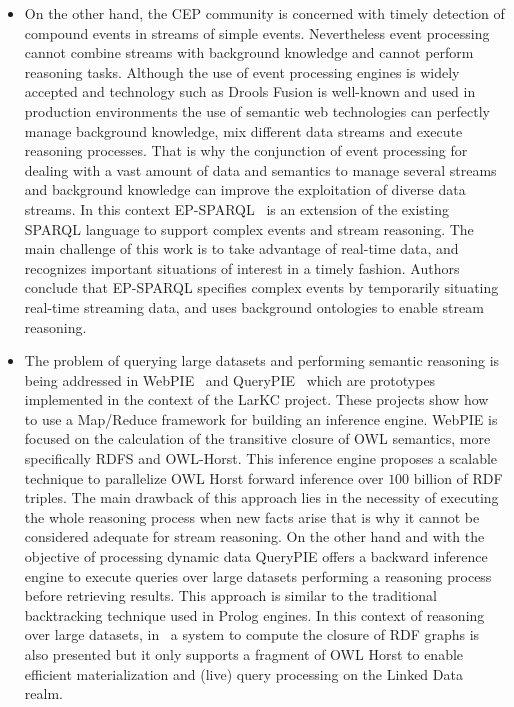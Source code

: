 \begin{itemize}
\item On the other hand, the CEP community is concerned with timely detection of 
compound events in streams of simple events. Nevertheless event processing 
cannot combine streams with background knowledge and cannot perform reasoning 
tasks. Although the use of event processing engines is widely accepted and 
technology such as Drools Fusion is well-known and used in production 
environments the use of semantic web technologies can perfectly manage 
background knowledge, mix different data streams and execute reasoning 
processes. That is why the conjunction of event processing for dealing with a 
vast amount of data and semantics to manage several streams and background 
knowledge can improve the exploitation of diverse data streams. In this context 
EP-SPARQL~\cite{Anicic:2011:EUL:1963405.1963495} is an extension of the existing SPARQL language to support complex 
events and stream reasoning. The main challenge of this work is to take 
advantage of real-time data, and recognizes important situations of interest in 
a timely fashion. Authors conclude that EP-SPARQL specifies complex events by 
temporarily situating real-time streaming data, and uses background ontologies 
to enable stream reasoning.

\item The problem of querying large datasets and performing semantic reasoning 
is being addressed in WebPIE~\cite{DBLP:journals/ws/UrbaniKMHB12} and QueryPIE~\cite{Urbani:2011:QBR:2063016.2063063} which are prototypes 
implemented in the context of the LarKC project. These projects show how to use 
a Map/Reduce framework for building an inference engine. WebPIE is focused on 
the calculation of the transitive closure of OWL semantics, more specifically 
RDFS and OWL-Horst. This inference engine proposes a scalable technique to 
parallelize OWL Horst forward inference over $100$ billion of RDF triples. The 
main drawback of this approach lies in the necessity of executing the whole 
reasoning process when new facts arise that is why it cannot be considered 
adequate for stream reasoning. On the other hand and with the objective of 
processing dynamic data QueryPIE offers a backward inference engine to execute 
queries over large datasets performing a reasoning process before retrieving 
results. This approach is similar to the traditional backtracking technique used 
in Prolog engines. In this context of reasoning over large datasets, in~\cite{DBLP:journals/ijswis/HoganHP09,Umbrich:2012:IRL:2415113.2415129,Umbrich:2012:FUW:2413941.2413963} 
a system to compute the closure of RDF graphs is also presented but it 
only supports a fragment of OWL Horst to enable efficient materialization and 
(live) query processing on the Linked Data realm. 


\end{itemize}

